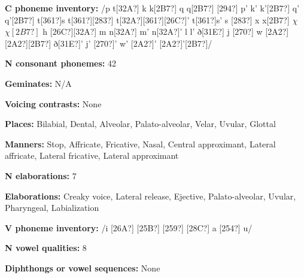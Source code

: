 \begin{styleBody}
\textbf{C phoneme inventory:} /p t[32A?] k k[2B7?] q q[2B7?] [294?] p’ k’ k’[2B7?] q’ q’[2B7?] t[361?]s t[361?][283?] t[32A?][361?][26C?]’ t[361?]s’ s [283?] x x[2B7?] $\chi $ $\chi [2B7?]$ h [26C?][32A?] m n[32A?] m’ n[32A?]’ l l’ ð[31E?] j [270?] w [2A2?] [2A2?][2B7?] ð[31E?]’ j’ [270?]’ w’ [2A2?]’ [2A2?]’[2B7?]/
\end{styleBody}

\begin{styleBody}
\textbf{N consonant phonemes:} 42
\end{styleBody}

\begin{styleBody}
\textbf{Geminates:} N/A
\end{styleBody}

\begin{styleBody}
\textbf{Voicing contrasts:} None
\end{styleBody}

\begin{styleBody}
\textbf{Places:} Bilabial, Dental, Alveolar, Palato-alveolar, Velar, Uvular, Glottal 
\end{styleBody}

\begin{styleBody}
\textbf{Manners:} Stop, Affricate, Fricative, Nasal, Central approximant, Lateral affricate, Lateral fricative, Lateral approximant
\end{styleBody}

\begin{styleBody}
\textbf{N elaborations:} 7
\end{styleBody}

\begin{styleBody}
\textbf{Elaborations:} Creaky voice, Lateral release, Ejective, Palato-alveolar, Uvular, Pharyngeal, Labialization
\end{styleBody}

\begin{styleBody}
\textbf{V phoneme inventory:} /i [26A?] [25B?] [259?] [28C?] a [254?] u/
\end{styleBody}

\begin{styleBody}
\textbf{N vowel qualities:} 8
\end{styleBody}

\begin{styleBody}
\textbf{Diphthongs or vowel sequences:} None
\end{styleBody}

